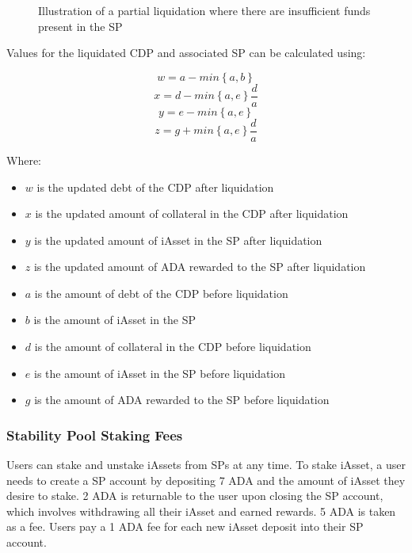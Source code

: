 \documentclass{article}
\begin{document}
\begin{sloppypar}
\hypertarget{partial-spl-figure}{%
\begin{figure}[htbp]
\centering

\caption{Illustration of a partial liquidation where there are
insufficient funds present in the SP}
\label{partial-spl-figure}
\end{figure}}

\filbreak

Values for the liquidated CDP and associated SP can be calculated using:

\[w = a - min\left\{ a,b \right\}\]
\[x = d - min\left\{ a,e \right\}\frac{d}{a}\]
\[y = e - min\left\{ a,e \right\}\]
\[z = g + min\left\{ a,e \right\}\frac{d}{a}\]

Where:

\begin{itemize}
\item
  \(w\) is the updated debt of the CDP after liquidation
\item
  \(x\) is the updated amount of collateral in the CDP after liquidation
\item
  \(y\) is the updated amount of iAsset in the SP after liquidation
\item
  \(z\) is the updated amount of ADA rewarded to the SP after
  liquidation
\item
  \(a\) is the amount of debt of the CDP before liquidation
\item
  \(b\) is the amount of iAsset in the SP
\item
  \(d\) is the amount of collateral in the CDP before liquidation
\item
  \(e\) is the amount of iAsset in the SP before liquidation
\item
  \(g\) is the amount of ADA rewarded to the SP before liquidation
\end{itemize}

\hypertarget{stability-pool-staking-fees}{%
\subsubsection{Stability Pool Staking
Fees}\label{stability-pool-staking-fees}}

Users can stake and unstake iAssets from SPs at any time. To stake
iAsset, a user needs to create a SP account by depositing 7 ADA and the
amount of iAsset they desire to stake. 2 ADA is returnable to the user
upon closing the SP account, which involves withdrawing all their iAsset
and earned rewards. 5 ADA is taken as a fee. Users pay a 1 ADA fee for
each new iAsset deposit into their SP account.


\end{sloppypar}
\end{document}
